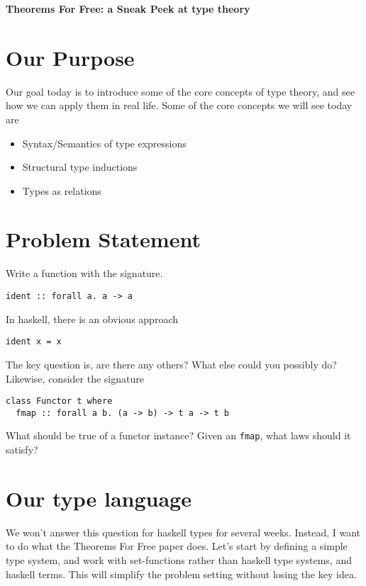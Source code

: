 \documentclass[12pt]{article}
\newcommand{\hask}{\texttt}
\begin{document}
\baselineskip 12pt

\begin{center}
\textbf{\Large Theorems For Free: a Sneak Peek at type theory} \\
\end{center}

\section{Our Purpose} \label{form}
Our goal today is to introduce some of the core concepts of type theory, and see how we can apply them in real life.
Some of the core concepts we will see today are 
\begin{itemize}
    \item Syntax/Semantics of type expressions
    \item Structural type inductions
    \item Types as relations
\end{itemize}

\section{Problem Statement}
Write a function with the signature.
\begin{verbatim} 
ident :: forall a. a -> a
\end{verbatim}
In haskell, there is an obvious approach

\begin{verbatim} 
ident x = x
\end{verbatim}
The key question is, are there any others? 
What else could you possibly do? 
Likewise, consider the signature
\begin{verbatim} 
class Functor t where 
  fmap :: forall a b. (a -> b) -> t a -> t b
\end{verbatim}
What should be true of a functor instance? Given an \hask{fmap}, what laws should it satisfy?
\section{Our type language}
We won't answer this question for haskell types for several weeks.
Instead, I want to do what the Theorems For Free paper does.
Let's start by defining a simple type system, and work with set-functions rather than 
haskell type systems, and haskell terms.
This will simplify the problem setting without losing the key idea.
\end{document}
